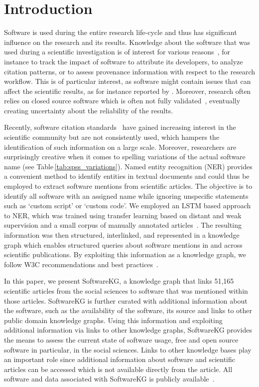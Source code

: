 \documentclass[runningheads]{llncs}
\newcommand{\tabref}[1]{Table\,\ref{#1}}
\begin{document}
\section{Introduction}
Software is used during the entire research life-cycle and thus has significant influence on the research and its results.
Knowledge about the software that was used during a scientific investigation is of interest for various reasons~\cite{Krueger2019}, for instance to track the impact of software to attribute its developers, to analyze citation patterns, or to assess provenance information with respect to the research workflow.
This is of particular interest, as software might contain issues that can affect the scientific results, as for instance reported by \cite{eklund2016cluster,Ziemann2016,Zeeberg2004}.
Moreover, research often relies on closed source software which is often not fully validated~\cite{Russo2016}, eventually creating uncertainty about the reliability of the results.

Recently, software citation standards~\cite{Smith2016} have gained increasing interest in the scientific community but are not consistently used, which hampers the identification of such information on a large scale.
Moreover, researchers are surprisingly creative when it comes to spelling variations of the actual software name (see \tabref{tab:spss_variations}).
Named entity recognition (NER) provides a convenient method to identify entities in textual documents and could thus be employed to extract software mentions from scientific articles. 
The objective is to identify all software with an assigned name while ignoring unspecific statements such as `custom script' or `custom code'.
We employed an LSTM based approach to NER, which was trained using transfer learning based on distant and weak supervision and a small corpus of manually annotated articles~\cite{Schindler_softwarekg_2020}.
The resulting information was then structured, interlinked, and represented in a knowledge graph which enables structured queries about software mentions in and across scientific publications.
By exploiting this information as a knowledge graph, we follow W3C recommendations and best practices~\cite{heath2011linked}.

In this paper, we present SoftwareKG, a knowledge graph that links 51,165 scientific articles from the social sciences to software that was mentioned within those articles.
SoftwareKG is further curated with additional information about the software, such as the availability of the software, its source and links to other public domain knowledge graphs.
Using this information and exploiting additional information via links to other knowledge graphs, SoftwareKG provides the means to assess the current state of software usage, free and open source software in particular, in the social sciences.
Links to other knowledge bases play an important role since additional information about software and scientific articles can be accessed which is not available directly from the article.
All software and data associated with SoftwareKG is publicly available~\cite{Schindler_softwarekg_2020}.
\end{document}
